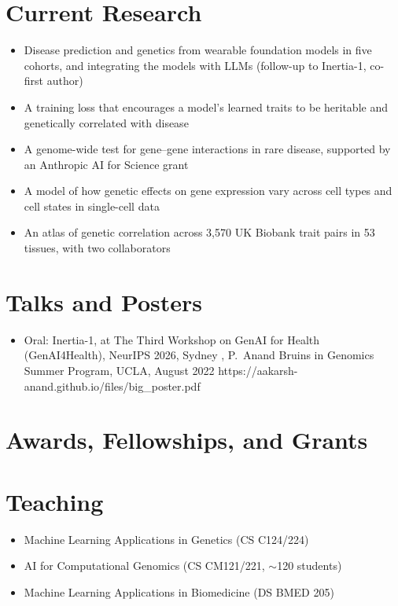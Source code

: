 \documentclass[10pt,letterpaper]{article}
\begin{document}
\section{Current Research}
\begin{itemize}
  \item Disease prediction and genetics from wearable foundation models in five cohorts, and integrating the models
    with LLMs (follow-up to Inertia-1, co-first author)
  \item A training loss that encourages a model's learned traits to be heritable and genetically correlated with disease
  \item A genome-wide test for gene--gene interactions in rare disease, supported by an Anthropic AI for Science grant
  \item A model of how genetic effects on gene expression vary across cell types and cell states in single-cell data
  \item An atlas of genetic correlation across 3,570 UK Biobank trait pairs in 53 tissues, with two collaborators
\end{itemize}

\section{Talks and Posters}
\begin{itemize}
  \item Oral: Inertia-1, at The Third Workshop on GenAI for Health (GenAI4Health), NeurIPS 2026, Sydney\hfill{}
      {\me, P.~Anand}
      {Bruins in Genomics Summer Program, UCLA, August 2022}
      {https://aakarsh-anand.github.io/files/big_poster.pdf}
\end{itemize}

\section{Awards, Fellowships, and Grants}

\section{Teaching}
\begin{itemize}
  \item Machine Learning Applications in Genetics (CS C124/224)\hfill{}
  \item AI for Computational Genomics (CS CM121/221, $\sim$120 students)\hfill{}
  \item Machine Learning Applications in Biomedicine (DS BMED 205)\hfill{}
\end{itemize}
\end{document}
